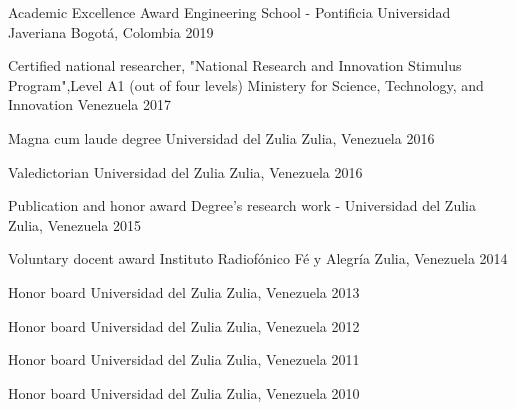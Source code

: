 
\begin{cvhonors}
    \cvhonor
    {Academic Excellence Award}
    {Engineering School - Pontificia Universidad Javeriana}
    {Bogotá, Colombia}
    {2019}

    \cvhonor
    {Certified national researcher, "National Research and Innovation Stimulus Program",Level A1 (out of four levels)}
    {Ministery for Science, Technology, and Innovation}
    {Venezuela}
    {2017}

    \cvhonor
    {Magna cum laude degree}
    {Universidad del Zulia}
    {Zulia, Venezuela}
    {2016}

    \cvhonor
    {Valedictorian}
    {Universidad del Zulia}
    {Zulia, Venezuela}
    {2016}

    \cvhonor
    {Publication and honor award}
    {Degree's research work - Universidad del Zulia}
    {Zulia, Venezuela}
    {2015}

    \cvhonor
    {Voluntary docent award}
    {Instituto Radiofónico Fé y Alegría}
    {Zulia, Venezuela}
    {2014}

    \cvhonor
    {Honor board}
    {Universidad del Zulia}
    {Zulia, Venezuela}
    {2013}

    \cvhonor
    {Honor board}
    {Universidad del Zulia}
    {Zulia, Venezuela}
    {2012}

    \cvhonor
    {Honor board}
    {Universidad del Zulia}
    {Zulia, Venezuela}
    {2011}

    \cvhonor
    {Honor board}
    {Universidad del Zulia}
    {Zulia, Venezuela}
    {2010}

\end{cvhonors}